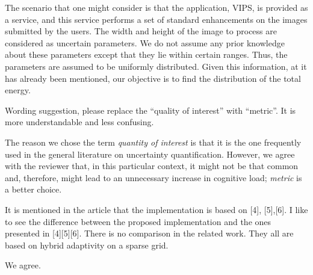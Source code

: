 \begin{authors}
The scenario that one might consider is that the application, VIPS, is provided
as a service, and this service performs a set of standard enhancements on the
images submitted by the users. The width and height of the image to process are
considered as uncertain parameters. We do not assume any prior knowledge about
these parameters except that they lie within certain ranges. Thus, the
parameters are assumed to be uniformly distributed. Given this information, at
it has already been mentioned, our objective is to find the distribution of the
total energy.

\begin{actions}
\end{actions}
\end{authors}

\begin{reviewer}
Wording suggestion, please replace the ``quality of interest'' with ``metric''.
It is more understandable and less confusing.
\end{reviewer}

\begin{authors}
The reason we chose the term \emph{quantity of interest} is that it is the one
frequently used in the general literature on uncertainty quantification.
However, we agree with the reviewer that, in this particular context, it might
not be that common and, therefore, might lead to an unnecessary increase in
cognitive load; \emph{metric} is a better choice.

\begin{actions}
\end{actions}
\end{authors}

\begin{reviewer}
It is mentioned in the article that the implementation is  based on [4],
[5],[6]. I like to see the difference between the proposed implementation and
the ones presented in [4][5][6]. There is no comparison in the related work.
They all are based on hybrid adaptivity on a sparse grid.
\end{reviewer}

\begin{authors}
We agree.

\begin{actions}
\end{actions}
\end{authors}

